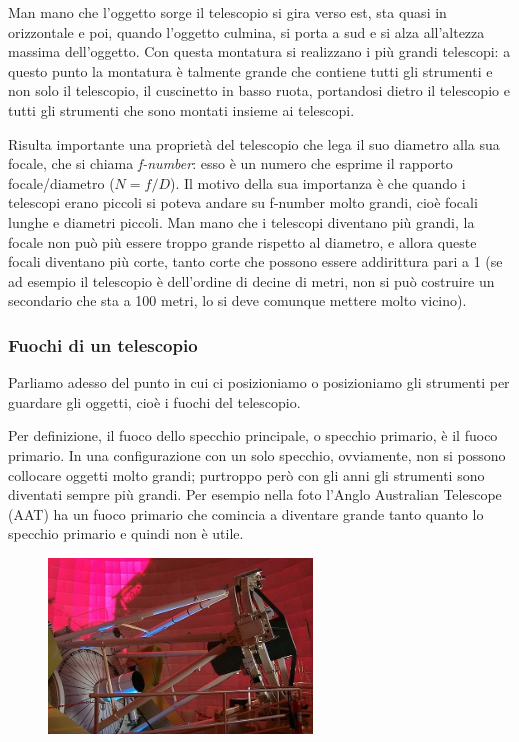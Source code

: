 Man mano che l'oggetto sorge il telescopio si gira verso est, sta quasi in orizzontale e poi, quando l'oggetto culmina, si porta a sud e si alza all'altezza massima dell'oggetto. Con questa montatura si realizzano i più grandi telescopi: a questo punto la montatura è talmente grande che contiene tutti gli strumenti e non solo il telescopio, il cuscinetto in basso ruota, portandosi dietro il telescopio e tutti gli strumenti che sono montati insieme ai telescopi.

\vspace{0.2cm}Risulta importante una proprietà del telescopio che lega il suo diametro alla sua focale, che si chiama \textit{f-number}: esso è un numero che esprime il rapporto focale/diametro ($N=f/D$). Il motivo della sua importanza è che quando i telescopi erano piccoli si poteva andare su f-number molto grandi, cioè focali lunghe e diametri piccoli. Man mano che i telescopi diventano più grandi, la focale non può più essere troppo grande rispetto al diametro, e allora queste focali diventano più corte, tanto corte che possono essere addirittura pari a 1 (se ad esempio il telescopio è dell'ordine di decine di metri, non si può costruire un secondario che sta a 100 metri, lo si deve comunque mettere molto vicino).

\subsubsection{Fuochi di un telescopio}

Parliamo adesso del punto in cui ci posizioniamo o posizioniamo gli strumenti per guardare gli oggetti, cioè i fuochi del telescopio.

Per definizione, il fuoco dello specchio principale, o specchio primario, è il fuoco primario. In una configurazione con un solo specchio, ovviamente, non si possono collocare oggetti molto grandi; purtroppo però con gli anni gli strumenti sono diventati sempre più grandi. Per esempio nella foto l'Anglo Australian Telescope (AAT) ha un fuoco primario che comincia a diventare grande tanto quanto lo specchio primario e quindi non è utile. 

\begin{figure}[H]
        \centering
        \includegraphics[width=7cm]{12.jpg}
        \label{}
    \end{figure}


